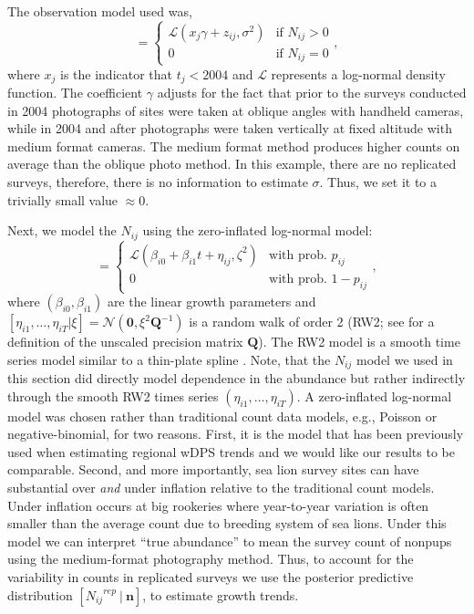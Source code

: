 \documentclass[12pt,letter,draft]{article}
\newcommand{\Nij}{\ensuremath{N_{ij}}}
\newcommand{\fN}{\ensuremath{\mathcal{N}}}
\begin{document}
The observation model used was,
\begin{equation}
[n_{ij}\ |\ \Nij,x_j, \gamma,\sigma] = \left\{
	\begin{array}{ll} 
	\mathcal{L}(x_j \gamma + z_{ij}, \sigma^2)& \mbox{if } N_{ij}>0\\
	0 & \mbox{if } N_{ij}=0
	\end{array}\right.,
\end{equation}
where $x_j$ is the indicator that $t_j < 2004$ and $\mathcal{L}$ represents a log-normal density function. The coefficient $\gamma$ adjusts for the fact that prior to the surveys conducted in 2004 photographs of sites were taken at oblique angles with handheld cameras, while in 2004 and after photographs were taken vertically at fixed altitude with medium format cameras. The medium format method produces higher counts on average than the oblique photo method. In this example, there are no replicated surveys, therefore, there is no information to estimate $\sigma$. Thus, we set it to a trivially small value $\approx 0$. 

Next, we model the $\Nij$ using the zero-inflated log-normal model:
\begin{equation}
[\Nij\ |\ \beta_{i0}, \beta_{i1}, \eta_{ij}] = \left\{
	\begin{array}{ll}
		\mathcal{L}(\beta_{i0} + \beta_{i1}t + \eta_{ij}, \zeta^2) & \mbox{with prob. } p_{ij}\\
		0 & \mbox{with prob. } 1-p_{ij}
	\end{array}\right.,
\end{equation}
where $(\beta_{i0},\beta_{i1})$ are the linear growth parameters and $[\eta_{i1},\dots,\eta_{iT}|\xi] = \fN(\mathbf{0},\xi^2\mathbf{Q}^{-1})$ is a random walk of order 2 (RW2; see \citealt{} for a definition of the unscaled precision matrix $\mathbf{Q}$). The RW2 model is a smooth time series model similar to a thin-plate spline \citep{Speckman:2003xa}. Note, that the $\Nij$ model we used in this section did directly model dependence in the abundance but rather indirectly through the smooth RW2 times series $(\eta_{i1},\dots,\eta_{iT})$. A zero-inflated log-normal model was chosen rather than traditional count data models, e.g., Poisson or negative-binomial, for two reasons. First, it is the model that has been previously used when estimating regional wDPS trends \citep{} and we would like our results to be comparable. Second, and more importantly, sea lion survey sites can have substantial over {\em and} under inflation relative to the traditional count models. Under inflation occurs at big rookeries where year-to-year variation is often smaller than the average count due to breeding system of sea lions. Under this model we can interpret ``true abundance'' to mean the survey count of nonpups using the medium-format photography method. Thus, to account for the variability in counts in replicated surveys we use the posterior predictive distribution $[\Nij^{rep}\ |\ \mathbf{n}]$, to estimate growth trends.  
\end{document}
